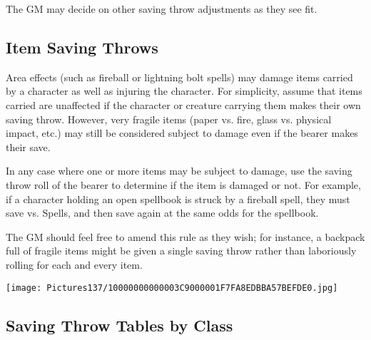 \documentclass[a4paper,twoside,openany,10pt]{book}
\begin{document}
\begin{multicols}{2}
The GM may decide on other saving throw adjustments as they see fit.

\subsection{Item Saving Throws}\label{item-saving-throws}

Area effects (such as fireball or lightning bolt spells) may damage items carried by a character as well as injuring the character. For simplicity, assume that items carried are unaffected if the character or creature carrying them makes their own saving throw. However, very fragile items (paper vs. fire, glass vs. physical impact, etc.) may still be considered subject to damage even if the bearer makes their save.

In any case where one or more items may be subject to damage, use the saving throw roll of the bearer to determine if the item is damaged or not. For example, if a character holding an open spellbook is struck by a fireball spell, they must save vs. Spells, and then save again at the same odds for the spellbook.

The GM should feel free to amend this rule as they wish; for instance, a backpack full of fragile items might be given a single saving throw rather than laboriously rolling for each and every item.

\end{multicols}

\vfill

\begin{center}
	\texttt{[image: Pictures137/10000000000003C9000001F7FA8EDBBA57BEFDE0.jpg]}
\end{center}

\pagebreak


\subsection{Saving Throw Tables by Class}\label{saving-throw-tables-by-class}
\end{document}
